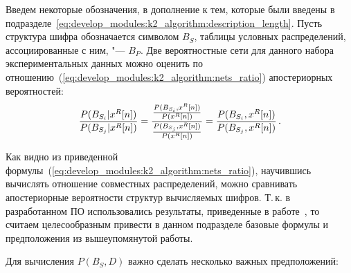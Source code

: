 Введем некоторые обозначения, в дополнение к тем, которые были введены в подразделе~\ref{eq:develop_modules:k2_algorithm:description_length}.
Пусть структура шифра обозначается символом $B_S$, таблицы условных распределений, ассоциированные с ним, "--- $B_P$.
Две вероятностные сети для данного набора экспериментальных данных можно оценить по отношению~(\ref{eq:develop_modules:k2_algorithm:nets_ratio}) апостериорных вероятностей:
\begin{equation}
  \label{eq:develop_modules:k2_algorithm:nets_ratio}
  \frac{P(B_{S_i} | x^R[n])}{P(B_{S_j} | x^R[n])} =
    \frac{ \frac{P(B_{S_i}, x^R[n])}{P(x^R[n])} }
         { \frac{P(B_{S_j}, x^R[n])}{P(x^R[n])} } =
    \frac{ P(B_{S_i}, x^R[n]) }
         { P(B_{S_j}, x^R[n]) } \text{\,.}
\end{equation}

Как видно из приведенной формулы~(\ref{eq:develop_modules:k2_algorithm:nets_ratio}), научившись вычислять отношение совместных распределений, можно сравнивать апостериорные вероятности структур вычисляемых шифров.
Т.\,к. в разработанном ПО использовались результаты, приведенные в работе~\cite{Cooper1991}, то считаем целесообразным привести в данном подразделе базовые формулы и предположения из вышеупомянутой работы.

Для вычисления $P(B_S, D)$ важно сделать несколько важных предположений:

